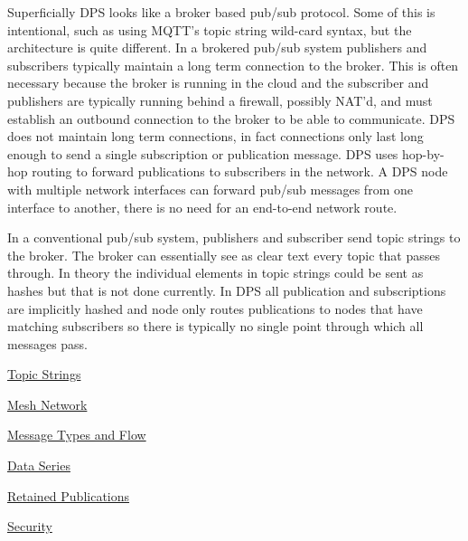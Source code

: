 Superficially D\+PS looks like a broker based pub/sub protocol. Some of this is intentional, such as using M\+Q\+T\+T’s topic string wild-\/card syntax, but the architecture is quite different. In a brokered pub/sub system publishers and subscribers typically maintain a long term connection to the broker. This is often necessary because the broker is running in the cloud and the subscriber and publishers are typically running behind a firewall, possibly N\+A\+T’d, and must establish an outbound connection to the broker to be able to communicate. D\+PS does not maintain long term connections, in fact connections only last long enough to send a single subscription or publication message. D\+PS uses hop-\/by-\/hop routing to forward publications to subscribers in the network. A D\+PS node with multiple network interfaces can forward pub/sub messages from one interface to another, there is no need for an end-\/to-\/end network route.

In a conventional pub/sub system, publishers and subscriber send topic strings to the broker. The broker can essentially see as clear text every topic that passes through. In theory the individual elements in topic strings could be sent as hashes but that is not done currently. In D\+PS all publication and subscriptions are implicitly hashed and node only routes publications to nodes that have matching subscribers so there is typically no single point through which all messages pass.


\begin{DoxyItemize}
\item \hyperlink{topic-strings}{Topic Strings}
\item \hyperlink{mesh-network}{Mesh Network}
\item \hyperlink{message-types-and-flow}{Message Types and Flow}
\item \hyperlink{data-series}{Data Series}
\item \hyperlink{retained-publications}{Retained Publications}
\item \hyperlink{security}{Security} 
\end{DoxyItemize}